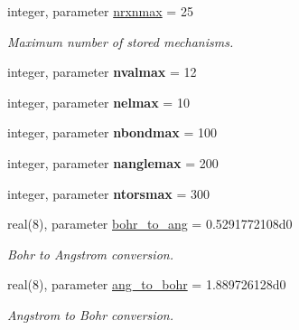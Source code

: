 \begin{DoxyCompactItemize}
integer, parameter \mbox{\hyperlink{namespaceconstants_ae186692659283278757ea6ef58e5afbf}{nrxnmax}} = 25
\begin{DoxyCompactList}\small\item\em Maximum number of stored mechanisms. \end{DoxyCompactList}\item 
\mbox{\label{namespaceconstants_a0ba7153d1cf2a1e771d3de3e4fa20bd2}} 
integer, parameter {\bfseries nvalmax} = 12
\item 
\mbox{\label{namespaceconstants_af5d223bec611b9c69cf9901d432a5399}} 
integer, parameter {\bfseries nelmax} = 10
\item 
\mbox{\label{namespaceconstants_ace3c3c956eaab49c4f76d6da9f4d8116}} 
integer, parameter {\bfseries nbondmax} = 100
\item 
\mbox{\label{namespaceconstants_a294bba2756e146e255646c046839c8f6}} 
integer, parameter {\bfseries nanglemax} = 200
\item 
\mbox{\label{namespaceconstants_af85d966801771d9090d3473c2698e498}} 
integer, parameter {\bfseries ntorsmax} = 300
\item 
\mbox{\label{namespaceconstants_a9dc5426c4be59d3bb2a7e96451876ae3}} 
real(8), parameter \mbox{\hyperlink{namespaceconstants_a9dc5426c4be59d3bb2a7e96451876ae3}{bohr\+\_\+to\+\_\+ang}} = 0.\+5291772108d0
\begin{DoxyCompactList}\small\item\em Bohr to Angstrom conversion. \end{DoxyCompactList}\item 
\mbox{\label{namespaceconstants_a1da8f83482de3e5ccaa5f49ff63dfaad}} 
real(8), parameter \mbox{\hyperlink{namespaceconstants_a1da8f83482de3e5ccaa5f49ff63dfaad}{ang\+\_\+to\+\_\+bohr}} = 1.\+889726128d0
\begin{DoxyCompactList}\small\item\em Angstrom to Bohr conversion. \end{DoxyCompactList}\item 
\mbox{\label{namespaceconstants_a65d52d0f0ed8afc2c85db912d19d598c}} 

\end{DoxyCompactItemize}
